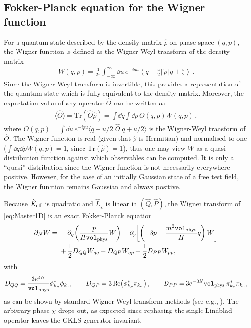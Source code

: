 \documentclass{article}
\def\bea{\begin{eqnarray}}
\def\eea{\end{eqnarray}}
\newcommand{\Vphys}{\mathtt{vol}_{\rm phys}}
\numberwithin{equation}{section}
\begin{document}
	\subsection{Fokker-Planck equation for the Wigner function}
	
		For a quantum state described by the density matrix $\hat{\rho}$ on phase space $(q,p)$, the Wigner function is defined as the Wigner-Weyl transform of the density matrix~\cite{Wigner:1932}
		\bea\label{eq:Wgendef}
		W(q, p) = \frac{1}{2\pi} \int_{-\infty}^{\infty} \dd u\, e^{- i p u} \left\langle q - \frac{u}{2} \bigg\vert \, \hat{\rho} \, \bigg\vert q + \frac{u}{2} \right\rangle \,.
		\eea
		Since the Wigner-Weyl transform is invertible, this provides a representation of the quantum state which is fully equivalent to the density matrix. Moreover, the expectation value of any operator $\hat{O}$ can be written as
		\bea
		\langle \hat{O}\rangle = \mathrm{Tr}(\hat{O}\hat{\rho}) = \int \dd q \int \dd p\, O(q,p) W(q,p)\, ,
		\eea
		where $O(q,p)=\int\dd u\,e^{-ipu}\langle q-u/2\vert \hat{O} \vert q+u/2\rangle$ is the Wigner-Weyl transform of $\hat{O}$. The Wigner function is real (given that $\hat{\rho}$ is Hermitian) and normalised to one ($\int \dd q \dd p W(q,p)=1$, since $\mathrm{Tr}(\hat{\rho})=1$), thus one may view $W$ as a quasi-distribution function against which observables can be computed. It is only a ``quasi'' distribution since the Wigner function is not necessarily everywhere positive. However, for the case of an initially Gaussian state of a free test field, the Wigner function remains Gaussian and always positive.

	Because \(\hat K_{\rm eff}\) is quadratic and \(\hat L_\chi\) is linear in \((\hat Q,\hat P)\), the Wigner transform of \cref{eq:Master1D} is an exact Fokker-Planck equation
	\begin{align}
		\partial_N W ={}& -\partial_q\!\left(\frac{p}{H\Vphys}W\right) -\partial_p\!\left[\left(-3p-\frac{m^2\Vphys}{H}q\right)W\right] \nonumber\\ &+ \frac12D_{QQ}W_{qq} + D_{QP}W_{qp} + \frac12D_{PP}W_{pp},
		\label{eq:FPGeneralMain}
	\end{align}
	with
	\begin{equation}
		D_{QQ}=\frac{3e^{3N}}{\Vphys}\phi_{k_\sigma}^*\phi_{k_\sigma}, \qquad D_{QP}=3\,{\rm Re}\!\left(\phi_{k_\sigma}^*\pi_{k_\sigma}\right), \qquad D_{PP}=3e^{-3N}\Vphys\,\pi_{k_\sigma}^*\pi_{k_\sigma} ,
		\label{eq:DiffusionGeneralMain}
	\end{equation}
	as can be shown by standard Wigner-Weyl transform methods (see e.g., \cite{wiseman2009quantum, petruccione}). The arbitrary phase \(\chi\) drops out, as expected since rephasing the single Lindblad operator leaves the GKLS generator invariant.
\end{document}
